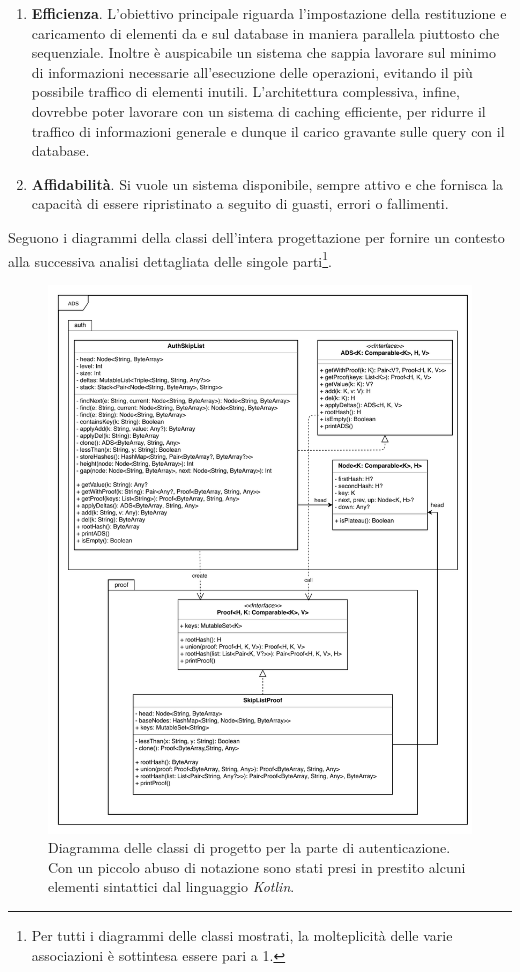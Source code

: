 	\begin{enumerate}
		\item \textbf{Efficienza}. L'obiettivo principale riguarda l'impostazione della restituzione e caricamento di elementi da e sul database in maniera parallela piuttosto che sequenziale. Inoltre è auspicabile un sistema che sappia lavorare sul minimo di informazioni necessarie all'esecuzione delle operazioni, evitando il più possibile traffico di elementi inutili. L'architettura complessiva, infine, dovrebbe poter lavorare con un sistema di caching efficiente, per ridurre il traffico di informazioni generale e dunque il carico gravante sulle query con il database.
		\item \textbf{Affidabilità}. Si vuole un sistema disponibile, sempre attivo e che fornisca la capacità di essere ripristinato a seguito di guasti, errori o fallimenti.
	\end{enumerate}

	Seguono i diagrammi della classi dell'intera progettazione per fornire un contesto alla successiva analisi dettagliata delle singole parti\footnote{Per tutti i diagrammi delle classi mostrati, la molteplicità delle varie associazioni è sottintesa essere pari a 1.}.

	\begin{figure}
		\centering
		\includegraphics[scale=0.65]{figure/Auth+Proof.pdf}
		\caption{Diagramma delle classi di progetto per la parte di autenticazione. Con un piccolo abuso di notazione sono stati presi in prestito alcuni elementi sintattici dal linguaggio \textit{Kotlin}.}\label{fig:authDCD}
	\end{figure}

